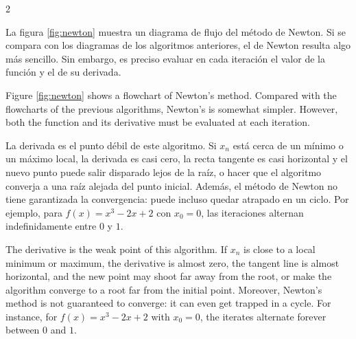 \begin{paracol}{2}

La figura \ref{fig:newton} muestra un diagrama de flujo del método de Newton. Si se compara con los diagramas de los algoritmos anteriores, el de Newton resulta algo más sencillo. Sin embargo, es preciso evaluar en cada iteración el valor de la función y el de su derivada.

\switchcolumn

Figure \ref{fig:newton} shows a flowchart of Newton's method. Compared with the flowcharts of the previous algorithms, Newton's is somewhat simpler. However, both the function and its derivative must be evaluated at each iteration.

\switchcolumn

La derivada es el punto débil de este algoritmo. Si $x_n$ está cerca de un mínimo o un máximo local, la derivada es casi cero, la recta tangente es casi horizontal y el nuevo punto puede salir disparado lejos de la raíz, o hacer que el algoritmo converja a una raíz alejada del punto inicial. Además, el método de Newton no tiene garantizada la convergencia: puede incluso quedar atrapado en un ciclo. Por ejemplo, para $f(x)=x^3-2x+2$ con $x_0=0$, las iteraciones alternan indefinidamente entre $0$ y $1$.

\switchcolumn

The derivative is the weak point of this algorithm. If $x_n$ is close to a local minimum or maximum, the derivative is almost zero, the tangent line is almost horizontal, and the new point may shoot far away from the root, or make the algorithm converge to a root far from the initial point. Moreover, Newton's method is not guaranteed to converge: it can even get trapped in a cycle. For instance, for $f(x)=x^3-2x+2$ with $x_0=0$, the iterates alternate forever between $0$ and $1$.

\end{paracol}

